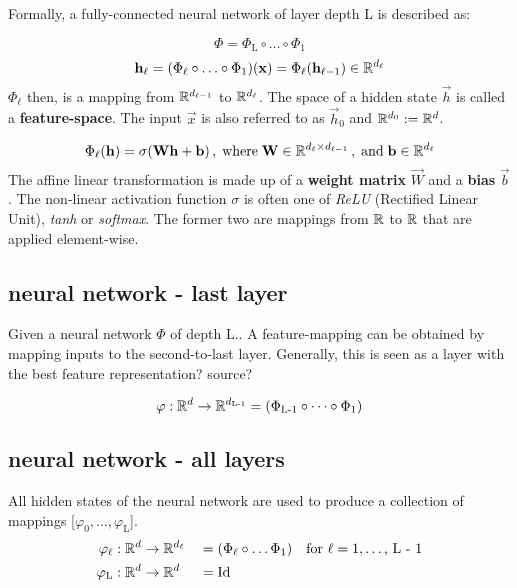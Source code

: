 Formally, a fully-connected neural network of layer depth L is described as:

\[
    \Phi = \Phi_\text{L} \circ \ldots \circ \Phi_1
\]
\[
    \mathbf h_\ell = (\Phi_\ell \circ \ldots \circ \Phi_1) (\mathbf x) =
    \Phi_\ell(\mathbf h_{\ell-1}) \in \mathbb{R}^{d_\ell}
\]
$\Phi_\ell$ then, is a mapping from $\mathbb{R}^{d_{\ell-1}}$ to $\mathbb{R}^{d_\ell}$. 
The space of a hidden state $\vec h$ is called a \textbf{feature-space}.
The input $\vec x$ is also referred to as $\vec h_0$ and $\mathbb{R}^{d_0} := \mathbb{R}^d$.

\[
    \Phi_\ell(\mathbf h) = \sigma (\mathbf W \mathbf h + \mathbf b) \,, \; \text{where} \;
    \mathbf W \in \mathbb{R}^{d_\ell \times d_{\ell-1}} \,, \; \text{and} \;
    \mathbf b \in \mathbb{R}^{d_\ell}
\]
The affine linear transformation is made up of a \textbf{weight matrix} $\vec W$ and a \textbf{bias} $\vec b$.
The non-linear activation function $\sigma$ is often one of \textit{ReLU} (Rectified Linear Unit), \textit{tanh} or \textit{softmax}. The former two are mappings from $\mathbb{R}$ to $\mathbb{R}$ that are applied element-wise.




\subsection{neural network - last layer}

Given a neural network $\Phi$ of depth L..
A feature-mapping can be obtained by mapping inputs to the second-to-last layer.
Generally, this is seen as a layer with the best feature representation? source?


\[
    \varphi : \mathbb{R}^d \to \mathbb{R}^{d_\textnormal{L-1}} = (\Phi_\textnormal{L-1} \circ \dots \circ \Phi_1)
\]
\subsection{neural network - all layers}
All hidden states of the neural network are used to produce a collection of mappings [$\varphi_0, \dots, \varphi_\text{L}$].
\begin{alignat*}{2}
    \varphi_\ell &: \mathbb{R}^d \to \mathbb{R}^{d_\ell} &&= (\Phi_\ell \circ \dots \Phi_1) \quad
    \text{for $\ell = 1, \dots$, L - 1} \\
    \varphi_\textnormal{L} &: \mathbb{R}^d \to \mathbb{R}^d &&= \textnormal{Id}
\end{alignat*}





